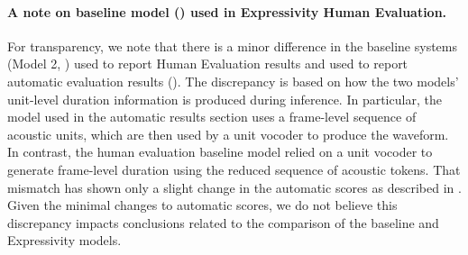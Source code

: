 \paragraph{A note on baseline model (\mfourttwo) used in Expressivity Human Evaluation.}
\label{sec:human_eval_expr_baseline_model_discussion}

For transparency, we note that there is a minor difference in the baseline systems (Model 2, \mfourttwo) used to report Human Evaluation results and used to report automatic evaluation results (). The discrepancy is based on how the two models' unit-level duration information is produced during inference. In particular, the model used in the automatic results section uses a frame-level sequence of acoustic units, which are then used by a unit vocoder to produce the waveform. In contrast, the human evaluation baseline model relied on a unit vocoder to generate frame-level duration using the reduced sequence of acoustic tokens. That mismatch has shown only a slight change in the automatic scores as described in . Given the minimal changes to automatic scores, we do not believe this discrepancy impacts conclusions related to the comparison of the baseline and Expressivity models.

